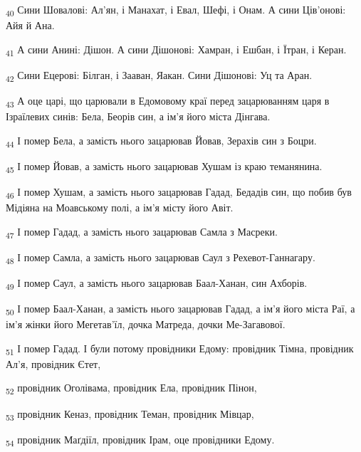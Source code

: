\begin{tcolorbox}
\textsubscript{40} Сини Шовалові: Ал'ян, і Манахат, і Евал, Шефі, і Онам. А сини Ців'онові: Айя й Ана.
\end{tcolorbox}
\begin{tcolorbox}
\textsubscript{41} А сини Анині: Дішон. А сини Дішонові: Хамран, і Ешбан, і Їтран, і Керан.
\end{tcolorbox}
\begin{tcolorbox}
\textsubscript{42} Сини Ецерові: Білган, і Зааван, Яакан. Сини Дішонові: Уц та Аран.
\end{tcolorbox}
\begin{tcolorbox}
\textsubscript{43} А оце царі, що царювали в Едомовому краї перед зацарюванням царя в Ізраїлевих синів: Бела, Беорів син, а ім'я його міста Дінгава.
\end{tcolorbox}
\begin{tcolorbox}
\textsubscript{44} І помер Бела, а замість нього зацарював Йовав, Зерахів син з Боцри.
\end{tcolorbox}
\begin{tcolorbox}
\textsubscript{45} І помер Йовав, а замість нього зацарював Хушам із краю теманянина.
\end{tcolorbox}
\begin{tcolorbox}
\textsubscript{46} І помер Хушам, а замість нього зацарював Гадад, Бедадів син, що побив був Мідіяна на Моавському полі, а ім'я місту його Авіт.
\end{tcolorbox}
\begin{tcolorbox}
\textsubscript{47} І помер Гадад, а замість нього зацарював Самла з Масреки.
\end{tcolorbox}
\begin{tcolorbox}
\textsubscript{48} І помер Самла, а замість нього зацарював Саул з Рехевот-Ганнагару.
\end{tcolorbox}
\begin{tcolorbox}
\textsubscript{49} І помер Саул, а замість нього зацарював Баал-Ханан, син Ахборів.
\end{tcolorbox}
\begin{tcolorbox}
\textsubscript{50} І помер Баал-Ханан, а замість нього зацарював Гадад, а ім'я його міста Раї, а ім'я жінки його Мегетав'їл, дочка Матреда, дочки Ме-Загавової.
\end{tcolorbox}
\begin{tcolorbox}
\textsubscript{51} І помер Гадад. І були потому провідники Едому: провідник Тімна, провідник Ал'я, провідник Єтет,
\end{tcolorbox}
\begin{tcolorbox}
\textsubscript{52} провідник Оголівама, провідник Ела, провідник Пінон,
\end{tcolorbox}
\begin{tcolorbox}
\textsubscript{53} провідник Кеназ, провідник Теман, провідник Мівцар,
\end{tcolorbox}
\begin{tcolorbox}
\textsubscript{54} провідник Маґдіїл, провідник Ірам, оце провідники Едому.
\end{tcolorbox}
